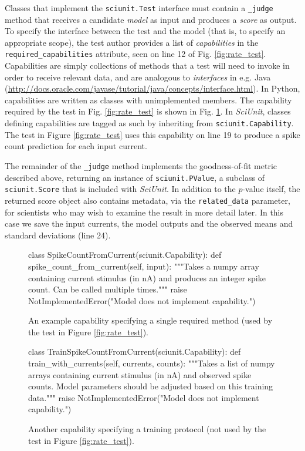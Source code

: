 \documentclass[9pt]{sig-alternate}
\let\verbx\lstinline
\begin{document}
Classes that implement the \verbx{sciunit.Test} interface must contain a \verbx{_judge} method that receives a candidate \emph{model} as input and produces a \textit{score} as output. 
To specify the interface between the test and the model (that is, to specify an appropriate scope), the test author provides a list of \emph{capabilities} in the \verbx{required_capabilities} attribute, seen on line 12 of Fig. \ref{fig:rate_test}. 
Capabilities are simply collections of methods that a test will need to invoke in order to receive relevant data, and are analogous to \emph{interfaces} in e.g. Java (\url{http://docs.oracle.com/javase/tutorial/java/concepts/interface.html}). 
In Python, capabilities are written as classes with unimplemented members. 
The capability required by the test in Fig. \ref{fig:rate_test} is shown in Fig. \ref{fig:capability}. 
In \textit{SciUnit}, classes defining capabilities are tagged as such by inheriting from \verbx{sciunit.Capability}. The test in Figure \ref{fig:rate_test} uses this capability on line 19 to produce a spike count prediction for each input current. 

The remainder of the \verbx{_judge} method implements the goodness-of-fit metric described above, returning an instance of \verbx{sciunit.PValue}, a subclass of \verbx{sciunit.Score} that is included with \textit{SciUnit}. In addition to the $p$-value itself, the returned score object also contains metadata, via the \verbx{related_data} parameter, for  scientists who may wish to examine the result in more detail later. 
In this case we save the input currents, the model outputs and the observed means and standard deviations (line 24). 

\begin{figure}
\begin{python}
class SpikeCountFromCurrent(sciunit.Capability):
  def spike_count_from_current(self, input): 
    """Takes a numpy array containing current stimulus (in nA) and
    produces an integer spike count. Can be called multiple times."""
    raise NotImplementedError("Model does not implement capability.")
\end{python}
\caption{An example capability specifying a single required method (used by the test in Figure \ref{fig:rate_test}).}
\label{fig:capability}
\vspace{-10px}
\end{figure}

\begin{figure}
\begin{python}
class TrainSpikeCountFromCurrent(sciunit.Capability):
  def train_with_currents(self, currents, counts):
    """Takes a list of numpy arrays containing current stimulus (in nA) and
    observed spike counts. Model parameters should be adjusted based on this
    training data."""
    raise NotImplementedError("Model does not implement capability.")
\end{python}
\caption{Another capability specifying a training protocol (not used by the test in Figure \ref{fig:rate_test}).}
\label{fig:training}
\vspace{-15px}
\end{figure}
\end{document}
